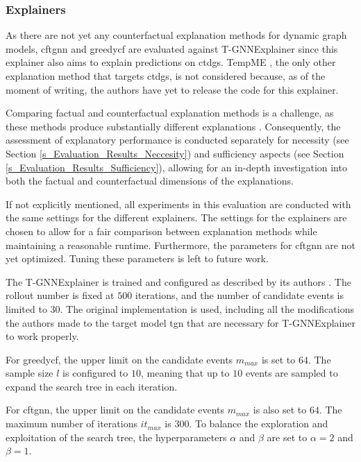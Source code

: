 \subsubsection{Explainers}
\label{s_Evaluation_Setup_Explainers}
As there are not yet any counterfactual explanation methods for dynamic graph models, \gls{cftgnn} and \gls{greedycf} are evaluated against T-GNNExplainer \cite{xia_explaining_2023} since this explainer also aims to explain predictions on \glspl{ctdg}. TempME \cite{chen_tempme_2023}, the only other explanation method that targets \glspl{ctdg}, is not considered because, as of the moment of writing, the authors have yet to release the code for this explainer. 

Comparing factual and counterfactual explanation methods is a challenge, as these methods produce substantially different explanations \cite{tan_learning_2022}. Consequently, the assessment of explanatory performance is conducted separately for necessity (see Section \ref{s_Evaluation_Results_Neccesity}) and sufficiency aspects (see Section \ref{s_Evaluation_Results_Sufficiency}), allowing for an in-depth investigation into both the factual and counterfactual dimensions of the explanations.

If not explicitly mentioned, all experiments in this evaluation are conducted with the same settings for the different explainers. The settings for the explainers are chosen to allow for a fair comparison between explanation methods while maintaining a reasonable runtime. Furthermore, the parameters for \gls{cftgnn} are not yet optimized. Tuning these parameters is left to future work.

The T-GNNExplainer is trained and configured as described by its authors \cite{xia_explaining_2023}. The rollout number is fixed at $500$ iterations, and the number of candidate events is limited to $30$. The original implementation is used, including all the modifications the authors made to the target model \gls{tgn} that are necessary for T-GNNExplainer to work properly.

For \gls{greedycf}, the upper limit on the candidate events $m_{max}$ is set to $64$. The sample size $l$ is configured to $10$, meaning that up to $10$ events are sampled to expand the search tree in each iteration.

For \gls{cftgnn}, the upper limit on the candidate events $m_{max}$ is also set to $64$. The maximum number of iterations $it_{max}$ is $300$. To balance the exploration and exploitation of the search tree, the hyperparameters $\alpha$ and $\beta$ are set to $\alpha = 2$ and $\beta = 1$.

